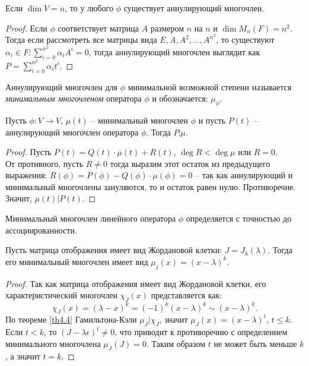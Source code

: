 \begin{note}
    Если $\dim V = n$, то у любого $\phi$ существует аннулирующий многочлен.
\end{note}

\begin{proof}
    Если $\phi$ соответствует матрица $A$ размером $n$ на $n$ и $\dim M_n(F) = n^2$. \\
    Тогда если рассмотреть все матрицы вида $E, A, A^2, \dots, A^{n^2}$, то существуют $\alpha_i \in F: \sum_{i = 0}^{n^2} \alpha_i A^i = 0$, тогда аннулирующий многочлен выглядит как $P = \sum_{i = 0}^{n^2} \alpha_i t^i$.
\end{proof}

\begin{definition}
    Аннулирующий многочлен для $\phi$ минимальной возможной степени называется \textit{минимальным многочленом} оператора $\phi$ и обозначается: $\mu_{\phi}$.
\end{definition}

\begin{theorem}
    \label{th4.5}
    Пусть $\phi: V \to V$, $\mu(t)$ -- минимальный многочлен $\phi$ и пусть $P(t)$ -- аннулирующий многочлен оператора $\phi$. Тогда $P \vdots \mu$.
\end{theorem}

\begin{proof}
    Пусть $P(t) = Q(t) \cdot \mu(t) + R(t)$, $\deg R < \deg \mu$ или $R = 0$. \\
    От противного, пусть $R \neq 0$ тогда выразим этот остаток из предыдущего выражения: 
    $R(\phi) = P(\phi) - Q(\phi) \cdot \mu (\phi) = 0$ -- так как аннулирующий и минимальный 
    многочлены зануляются, то и остаток равен нулю. Противоречие. Значит, $\mu(t) \vert P(t)$.
\end{proof}

\begin{corollary}
    Минимальный многочлен линейного оператора $\phi$ определяется с точностью до ассоциированности.
\end{corollary}

\begin{proposition}
    Пусть матрица отображения имеет вид Жордановой клетки: $J = J_k(\lambda)$. 
    Тогда его минимальный многочлен имеет вид $\mu_j(x) = (x - \lambda)^k$.
\end{proposition}

\begin{proof}
    Так как матрица отображения имеет вид Жордановой клетки, 
    его характеристический многочлен $\chi_J(x)$ представляется как:
    $$\chi_J(x) = (\lambda - x)^k = (-1)^k (x - \lambda)^k \sim (x - \lambda)^k.$$
    По теореме \ref{th4.4} Гамильтона-Кэли $\mu_J \vert \chi_J$, значит $\mu_J (x) = (x - \lambda)^t$, $t \leq k$.
    Если $t < k$, то $(J - \lambda \epsilon)^t \neq 0$, 
    что приводит к противоречию с определением минимального многочлена $\mu_J(J) = 0$.  
    Таким образом $t$ не может быть меньше $k$, а значит $t = k$. 
\end{proof}

